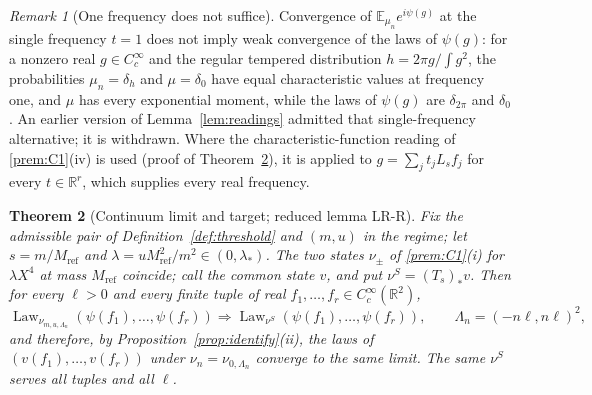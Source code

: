 \documentclass[11pt]{article}
\theoremstyle{plain}
\newtheorem{theorem}{Theorem}[section]
\theoremstyle{definition}
\theoremstyle{remark}
\newtheorem{remark}[theorem]{Remark}
\newcommand{\R}{\mathbb{R}}
\newcommand{\E}{\mathbb{E}}
\DeclareMathOperator{\Law}{Law}
\begin{document}
\begin{remark}[One frequency does not suffice]\label{rem:readings}
Convergence of $\E_{\mu_n}e^{i\psi(g)}$ at the single frequency $t=1$ does not imply
weak convergence of the laws of $\psi(g)$: for a nonzero real $g\in C_c^{\infty}$ and
the regular tempered distribution $h=2\pi g/\int g^{2}$, the probabilities
$\mu_n=\delta_h$ and $\mu=\delta_0$ have equal characteristic values at frequency
one, and $\mu$ has every exponential moment, while the laws of $\psi(g)$ are
$\delta_{2\pi}$ and $\delta_0$. An earlier version of Lemma~\ref{lem:readings} admitted
that single-frequency alternative; it is withdrawn. Where the
characteristic-function reading of \ref{prem:C1}(iv) is used (proof of
Theorem~\ref{thm:LR}), it is applied to $g=\sum_jt_jL_sf_j$ for every $t\in\R^{r}$,
which supplies every real frequency.
\end{remark}

\begin{theorem}[Continuum limit and target; reduced lemma LR-R]\label{thm:LR}
Fix the admissible pair of Definition~\ref{def:threshold} and $(m,u)$ in the regime;
let $s=m/M_{\mathrm{ref}}$ and $\lambda=uM_{\mathrm{ref}}^{2}/m^{2}\in(0,\lambda_*)$. The two states
$\nu_\pm$ of \ref{prem:C1}(i) for $\lambda X^{4}$ at mass $M_{\mathrm{ref}}$ coincide; call the
common state $v$, and put $\nu^{S}=(T_s)_*v$. Then for every $\ell>0$ and every finite
tuple of real $f_1,\dots,f_r\in C_c^{\infty}(\R^{2})$,
\[
\Law_{\nu_{m,u,\Lambda_n}}(\psi(f_1),\dots,\psi(f_r))\Rightarrow\Law_{\nu^{S}}(\psi(f_1),\dots,\psi(f_r)),
\qquad \Lambda_n=(-n\ell,n\ell)^{2},
\]
and therefore, by Proposition~\ref{prop:identify}(ii), the laws of
$(v(f_1),\dots,v(f_r))$ under $\nu_n=\nu_{0,\Lambda_n}$ converge to the same limit. The
same $\nu^{S}$ serves all tuples and all $\ell$.
\end{theorem}
\end{document}
